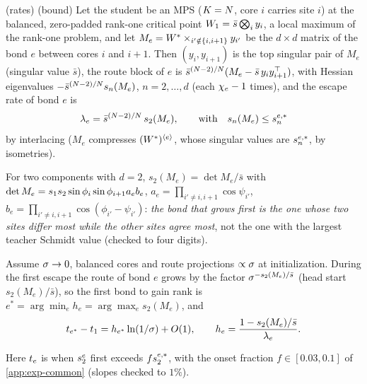 \begin{proposition}\label{prop:A-mps-rates}
  \derived{} (rates) \proven{} (bound) \newresult{}
  Let the student be an MPS ($K=N$, core $i$ carries site $i$) at the balanced, zero-padded rank-one
  critical point $W_1=\bar s\bigotimes_iy_i$, a local maximum of the rank-one problem, and let
  $M_e=W^{*}\times_{i'\notin\{i,i+1\}}y_{i'}$ be the $d\times d$ matrix of the bond $e$ between cores $i$ and $i+1$. Then
  $(y_i,y_{i+1})$ is the top singular pair of $M_e$ (singular value $\bar s$), the route block of $e$ is
  $\bar s^{(N-2)/N}(M_e-\bar s\,y_iy_{i+1}^{\top})$, with Hessian eigenvalues $-\bar s^{(N-2)/N}s_n(M_e)$, $n=2,\dots,d$ (each
  $\chi_{e}-1$ times), and the escape rate of bond $e$ is
  \begin{equation}\label{eq:A-gamma-e}
    \lambda_e=\bar s^{(N-2)/N}\,s_2(M_e),\qquad\text{with}\quad
    s_n(M_e)\le s^{e,*}_{n}
  \end{equation}
  by interlacing ($M_e$ compresses $(W^{*})^{\langle e\rangle}$, whose singular values are $s^{e,*}_{n}$, by isometries).
\end{proposition}
For two components with $d=2$, $s_2(M_e)=\det M_e/\bar s$ with $\det M_e=s_{1}s_{2}\sin\phi_i\sin\phi_{i+1}a_eb_e$,
$a_e=\prod_{i'\ne i,i+1}\cos\psi_{i'}$, $b_e=\prod_{i'\ne i,i+1}\cos(\phi_{i'}-\psi_{i'})$: \emph{the bond that grows first is the one
whose two sites differ most while the other sites agree most}, not the one with the largest teacher
Schmidt value (checked to four digits).

\begin{corollary}\label{cor:A-second-escape}
  \derived{}  
  Assume $\sigma\to0$, balanced cores and route projections $\propto\sigma$ at initialization. During the first
  escape the route of bond $e$ grows by the factor $\sigma^{-s_2(M_e)/\bar s}$ (head start $s_2(M_e)/\bar s$), so the first bond to
  gain rank is $e^*=\arg\min_eh_e=\arg\max_es_2(M_e)$, and
  \begin{equation}\label{eq:A-second-escape}
    t_{e^*}-t_{1}=h_{e^*}\ln(1/\sigma)+O(1),\qquad h_e=\frac{1-s_2(M_e)/\bar s}{\lambda_e}.
  \end{equation}
\end{corollary}
Here $t_{e}$ is when $s^{e}_{2}$ first exceeds $fs^{e,*}_{2}$, with the onset fraction $f\in[0.03,0.1]$ of
\cref{app:exp-common} (slopes checked to $1\%$).

